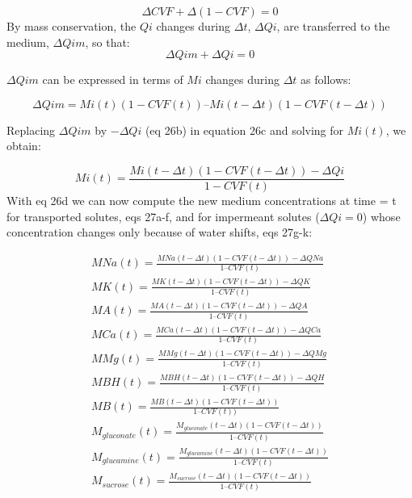 \documentclass[a4paper]{article}
\newcommand{\med}[1]{M#1}
\newcommand{\MA}{\med{A}}
\newcommand{\MB}{\med{B}}
\newcommand{\MBH}{\med{BH}}
\newcommand{\MGluca}{M_{glucamine}}
\newcommand{\MNa}{\med{Na}}
\newcommand{\MK}{\med{K}}
\newcommand{\MGluco}{M_{gluconate}}
\newcommand{\MCa}{\med{Ca}}
\newcommand{\MMg}{\med{Mg}}
\newcommand{\MSuc}{M_{sucrose}}
\begin{document}
\setcounter{equation}{0}
\renewcommand{\theequation}{26\alph{equation}}

\begin{equation}
\Delta CVF + \Delta (1-CVF) = 0
\end{equation}
By mass conservation, the $Qi$ changes during $\Delta t$, $\Delta Qi$, are transferred to the medium, $\Delta Qim$, so that:
\begin{equation}
\Delta Qim + \Delta Qi = 0  
\end{equation}

$\Delta Qim$ can be expressed in terms of $Mi$ changes during $\Delta t$ as follows:

\begin{equation}
\Delta Qim = Mi(t)(1-CVF(t)) – Mi(t-\Delta t)(1-CVF(t-\Delta t)) 
\end{equation}

Replacing $\Delta Qim$ by $-\Delta Qi$ (eq 26b) in equation 26c and solving for $Mi(t)$, we obtain:

\begin{equation}
Mi(t) = \frac{Mi(t-\Delta t)(1 - CVF(t-\Delta t)) - \Delta Qi}{1 - CVF(t)}
\end{equation}
With eq 26d we can now compute the new medium concentrations at time = t for transported solutes, eqs 27a-f, and for impermeant solutes ($\Delta Qi = 0$) whose concentration changes only because of water shifts, eqs 27g-k:

\setcounter{equation}{0}
\renewcommand{\theequation}{27\alph{equation}}

\begin{eqnarray}
\MNa(t) = \frac{\MNa(t-\Delta t)(1-CVF(t-\Delta t)) - \Delta QNa}{1 – CVF(t) }\\
\MK(t) = \frac{\MK(t-\Delta t)(1-CVF(t-\Delta t)) - \Delta QK}{1 – CVF(t) }\\
\MA(t) = \frac{\MA(t-\Delta t)(1-CVF(t-\Delta t)) - \Delta QA}{1 – CVF(t) }\\
\MCa(t) = \frac{\MCa(t-\Delta t)(1-CVF(t-\Delta t)) - \Delta QCa}{1 – CVF(t) }\\
\MMg(t) = \frac{\MMg(t-\Delta t)(1-CVF(t-\Delta t)) - \Delta QMg}{1 – CVF(t) }\\
\MBH(t) = \frac{\MBH(t-\Delta t)(1-CVF(t-\Delta t)) - \Delta QH}{1 – CVF(t) }\\
\MB(t) = \frac{\MB(t-\Delta t)(1-CVF(t-\Delta t))}{1 – CVF(t)) }\\
\MGluco(t) = \frac{\MGluco(t-\Delta t)(1-CVF(t-\Delta t))}{1 – CVF(t) }\\
\MGluca(t) = \frac{\MGluca(t-\Delta t)(1-CVF(t-\Delta t))}{1 – CVF(t) }\\
\MSuc(t) = \frac{\MSuc(t-\Delta t)(1-CVF(t-\Delta t))}{1 – CVF(t)} 
\end{eqnarray}
\end{document}
